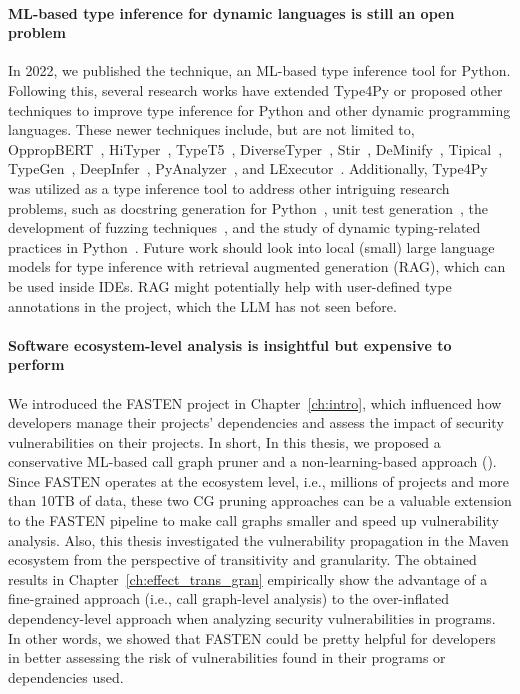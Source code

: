 \paragraph{ML-based type inference for dynamic languages is still an open problem} 
In 2022, we published the  technique, an ML-based type inference tool for Python. Following this, several research works have extended Type4Py or proposed other techniques to improve type inference for Python and other dynamic programming languages. These newer techniques include, but are not limited to, OppropBERT~\cite{jha2022oppropbert}, HiTyper~\cite{peng2022static}, TypeT5~\cite{wei2022typet5}, DiverseTyper~\cite{jesse2022learning}, Stir~\cite{peng2023statistical}, DeMinify~\cite{li2023deminify}, Tipical~\cite{elkobi2023tipical}, TypeGen~\cite{peng2023generative}, DeepInfer~\cite{zhao2023deepinfer}, PyAnalyzer~\cite{jin2024pyanalyzer}, and LExecutor~\cite{souza2023lexecutor}. Additionally, Type4Py was utilized as a type inference tool to address other intriguing research problems, such as docstring generation for Python~\cite{venkatkrishna2023docgen}, unit test generation~\cite{lukasczyk2022pynguin}, the development of fuzzing techniques~\cite{li2023pyrtfuzz}, and the study of dynamic typing-related practices in Python~\cite{chen2024risky}. Future work should look into local (small) large language models for type inference with retrieval augmented generation (RAG), which can be used inside IDEs. RAG might potentially help with user-defined type annotations in the project, which the LLM has not seen before.

\paragraph{Software ecosystem-level analysis is insightful but expensive to perform} We introduced the FASTEN project in Chapter~\ref{ch:intro}, which influenced how developers manage their projects' dependencies and assess the impact of security vulnerabilities on their projects. In short, In this thesis, we proposed a conservative ML-based call graph pruner and a non-learning-based approach (). Since FASTEN operates at the ecosystem level, i.e., millions of projects and more than 10TB of data, these two CG pruning approaches can be a valuable extension to the FASTEN pipeline to make call graphs smaller and speed up vulnerability analysis. Also, this thesis investigated the vulnerability propagation in the Maven ecosystem from the perspective of transitivity and granularity. The obtained results in Chapter~\ref{ch:effect_trans_gran} empirically show the advantage of a fine-grained approach (i.e., call graph-level analysis) to the over-inflated dependency-level approach when analyzing security vulnerabilities in programs. In other words, we showed that FASTEN could be pretty helpful for developers in better assessing the risk of vulnerabilities found in their programs or dependencies used.  

